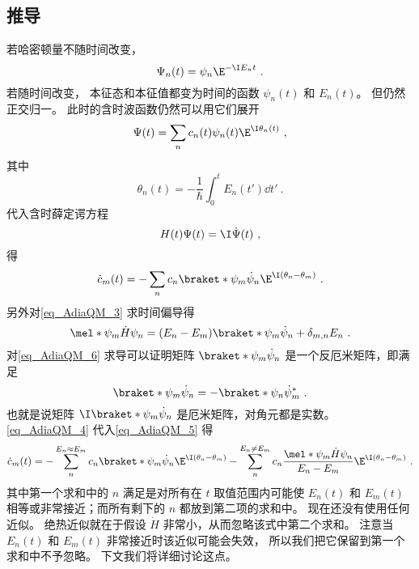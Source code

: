 \subsection{推导}
若哈密顿量不随时间改变，
\begin{equation}
\Psi_n(t) = \psi_n \E^{-\I E_n t}~.
\end{equation}
若随时间改变， 本征态和本征值都变为时间的函数 $\psi_n(t)$ 和 $E_n(t)$。 但仍然正交归一。 此时的含时波函数仍然可以用它们展开
\begin{equation}
\Psi(t) = \sum_n c_n(t) \psi_n(t) \E^{\I \theta_n(t)}~,
\end{equation}
其中
\begin{equation}
\theta_n(t) = -\frac{1}{\hbar} \int_0^t E_n(t')\dd{t'}~.
\end{equation}
代入含时薛定谔方程
\begin{equation}\label{eq_AdiaQM_1}
H(t)\Psi(t) = \I \dot \Psi(t)~,
\end{equation}
得
\begin{equation}\label{eq_AdiaQM_5}
\dot c_m(t) = -\sum_n c_n \braket*{\psi_m}{\dot\psi_n}\E^{\I(\theta_n-\theta_m)}~.
\end{equation}
另外对\autoref{eq_AdiaQM_3} 求时间偏导得
\begin{equation}\label{eq_AdiaQM_4}
\mel*{\psi_m}{\dot H}{\psi_n} = (E_n-E_m)\braket*{\psi_m}{\dot\psi_n} + \delta_{m,n}E_n~.
\end{equation}
对\autoref{eq_AdiaQM_6} 求导可以证明矩阵 $\braket*{\psi_m}{\dot\psi_n}$ 是一个反厄米矩阵，即满足
\begin{equation}\label{eq_AdiaQM_7}
\braket*{\psi_m}{\dot\psi_n} = -\braket*{\psi_n}{\dot\psi_m}^*~.
\end{equation}
也就是说矩阵 $\I\braket*{\psi_m}{\dot\psi_n}$ 是厄米矩阵，对角元都是实数。
\autoref{eq_AdiaQM_4} 代入\autoref{eq_AdiaQM_5} 得
\begin{equation}\label{eq_AdiaQM_8}
\dot c_m(t) = - \sum_{n}^{E_n\approx E_m} c_n \braket*{\psi_m}{\dot\psi_n}\E^{\I(\theta_n-\theta_m)}
- \sum_{n}^{E_n\ne E_m} c_n \frac{\mel*{\psi_m}{\dot H}{\psi_n}}{E_n-E_m}\E^{\I(\theta_n-\theta_m)}~.
\end{equation}
其中第一个求和中的 $n$ 满足是对所有在 $t$ 取值范围内可能使 $E_n(t)$ 和 $E_m(t)$ 相等或非常接近；而所有剩下的 $n$ 都放到第二项的求和中。 现在还没有使用任何近似。 绝热近似就在于假设 $\dot H$ 非常小，从而忽略该式中第二个求和。 注意当 $E_n(t)$ 和 $E_m(t)$ 非常接近时该近似可能会失效， 所以我们把它保留到第一个求和中不予忽略。 下文我们将详细讨论这点。

